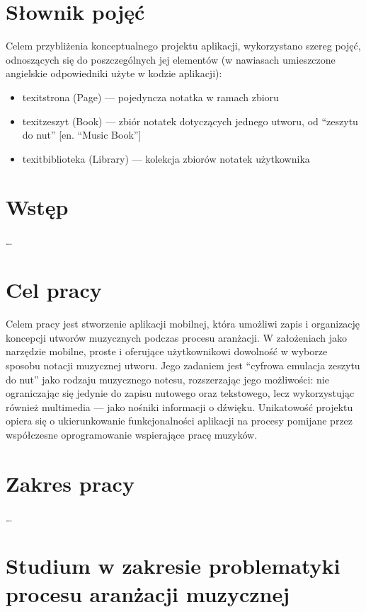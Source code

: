 \documentclass[12pt]{article}
\begin{document}
\newpage
\clearpage
\tableofcontents

\newpage
{}
\section*{Słownik pojęć}
Celem przybliżenia konceptualnego projektu aplikacji, wykorzystano szereg pojęć, odnoszących się do poszczególnych jej
elementów (w nawiasach umieszczone angielskie odpowiedniki użyte w kodzie aplikacji):
\begin{itemize}
	\item texit{strona} (Page) — pojedyncza notatka w ramach zbioru
	\item texit{zeszyt} (Book) — zbiór notatek dotyczących jednego utworu, od \enquote{zeszytu do nut} [en. \enquote{Music Book}]
	\item texit{biblioteka} (Library) — kolekcja zbiorów notatek użytkownika
\end{itemize}

\newpage
{}
\section*{Wstęp}
…

\newpage
{}
\section*{Cel pracy}
Celem pracy jest stworzenie aplikacji mobilnej, która umożliwi zapis i organizację koncepcji utworów muzycznych podczas procesu aranżacji.
W założeniach jako narzędzie mobilne, proste i oferujące użytkownikowi dowolność w wyborze sposobu notacji muzycznej utworu.
Jego zadaniem jest \enquote{cyfrowa emulacja zeszytu do nut} jako rodzaju muzycznego notesu, rozszerzając jego możliwości: nie
ograniczając się jedynie do zapisu nutowego oraz tekstowego, lecz wykorzystując również multimedia — jako nośniki informacji o dźwięku.
Unikatowość projektu opiera się o ukierunkowanie funkcjonalności aplikacji na procesy pomijane przez współczesne oprogramowanie
wspierające pracę muzyków.

\newpage
{}
\section*{Zakres pracy}
…

\newpage
\section{Studium w zakresie problematyki procesu aranżacji muzycznej}
\end{document}
